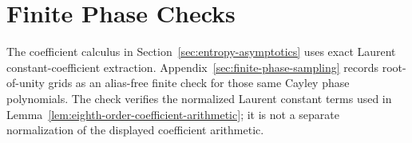 \section{Finite Phase Checks}\label{sec:finite-phase-checks}

The coefficient calculus in Section~\ref{sec:entropy-asymptotics} uses exact
Laurent constant-coefficient extraction.  Appendix~\ref{sec:finite-phase-sampling}
records root-of-unity grids as an alias-free finite check for those same
Cayley phase polynomials.  The check verifies the normalized Laurent
constant terms used in Lemma~\ref{lem:eighth-order-coefficient-arithmetic};
it is not a separate normalization of the displayed coefficient arithmetic.
